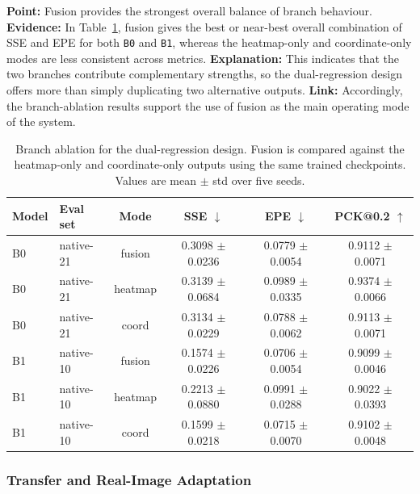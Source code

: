 \documentclass[10pt,letterpaper]{article}
\begin{document}
\medskip
\noindent\textbf{Point:} Fusion provides the strongest overall balance of branch behaviour.  
\textbf{Evidence:} In Table~\ref{tab:branch_ablation}, fusion gives the best or near-best overall combination of SSE and EPE for both \texttt{B0} and \texttt{B1}, whereas the heatmap-only and coordinate-only modes are less consistent across metrics.  
\textbf{Explanation:} This indicates that the two branches contribute complementary strengths, so the dual-regression design offers more than simply duplicating two alternative outputs.  
\textbf{Link:} Accordingly, the branch-ablation results support the use of fusion as the main operating mode of the system.

\begin{table}[H]
\centering
\footnotesize
\caption{Branch ablation for the dual-regression design. Fusion is compared against the heatmap-only and coordinate-only outputs using the same trained checkpoints. Values are mean $\pm$ std over five seeds.}
\label{tab:branch_ablation}
\begin{tabular}{llcccc}
\toprule
Model & Eval set & Mode & SSE $\downarrow$ & EPE $\downarrow$ & PCK@0.2 $\uparrow$ \\
\midrule
B0 & native-21 & fusion & 0.3098 $\pm$ 0.0236 & 0.0779 $\pm$ 0.0054 & 0.9112 $\pm$ 0.0071 \\
B0 & native-21 & heatmap & 0.3139 $\pm$ 0.0684 & 0.0989 $\pm$ 0.0335 & 0.9374 $\pm$ 0.0066 \\
B0 & native-21 & coord & 0.3134 $\pm$ 0.0229 & 0.0788 $\pm$ 0.0062 & 0.9113 $\pm$ 0.0071 \\
B1 & native-10 & fusion & 0.1574 $\pm$ 0.0226 & 0.0706 $\pm$ 0.0054 & 0.9099 $\pm$ 0.0046 \\
B1 & native-10 & heatmap & 0.2213 $\pm$ 0.0880 & 0.0991 $\pm$ 0.0288 & 0.9022 $\pm$ 0.0393 \\
B1 & native-10 & coord & 0.1599 $\pm$ 0.0218 & 0.0715 $\pm$ 0.0070 & 0.9102 $\pm$ 0.0048 \\
\bottomrule
\end{tabular}
\end{table}

\subsubsection{Transfer and Real-Image Adaptation}
\end{document}

